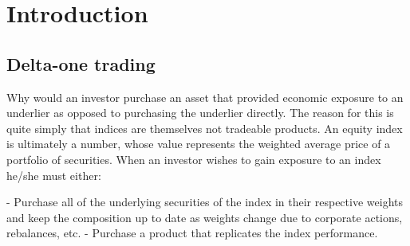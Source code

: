 \chapter{Introduction}







\section{Delta-one trading}
Why would an investor purchase an asset that provided economic exposure to an underlier as opposed to purchasing the underlier directly. The reason for this is quite simply that indices are themselves not tradeable products. An equity index is ultimately a number, whose value represents the weighted average price of a portfolio of securities. When an investor wishes to gain exposure to an index he/she must either:

- Purchase all of the underlying securities of the index in their respective weights and keep the composition up to date as weights change due to corporate actions, rebalances, etc.
- Purchase a product that replicates the index performance.

